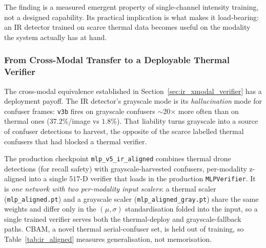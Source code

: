The finding is a measured emergent property of single-channel intensity training, not a designed capability. Its practical implication is what makes it load-bearing: an IR detector trained on scarce thermal data becomes useful on the modality the system actually has at hand.

\subsubsection{From Cross-Modal Transfer to a Deployable Thermal Verifier}
\label{sec:grayscale_verifier}

The cross-modal equivalence established in Section~\ref{sec:ir_xmodal_verifier} has a deployment payoff. The IR detector's grayscale mode is its \emph{hallucination} mode for confuser frames: \texttt{v3b} fires on grayscale confusers $\sim$20$\times$ more often than on thermal ones ($37.2\%$/image vs $1.8\%$). That liability turns grayscale into a source of confuser detections to harvest, the opposite of the scarce labelled thermal confusers that had blocked a thermal verifier.

The production checkpoint \texttt{mlp\_v5\_ir\_aligned} combines thermal drone detections (for recall safety) with grayscale-harvested confusers, per-modality z-aligned into a single $517$-D verifier that loads in the production \texttt{MLPVerifier}. It is \emph{one network with two per-modality input scalers}: a thermal scaler (\texttt{mlp\_aligned.pt}) and a grayscale scaler (\texttt{mlp\_aligned\_gray.pt}) share the same weights and differ only in the $(\mu,\sigma)$ standardisation folded into the input, so a single trained verifier serves both the thermal-deploy and grayscale-fallback paths. CBAM, a novel thermal aerial-confuser set, is held out of training, so Table~\ref{tab:ir_aligned} measures generalisation, not memorisation.


